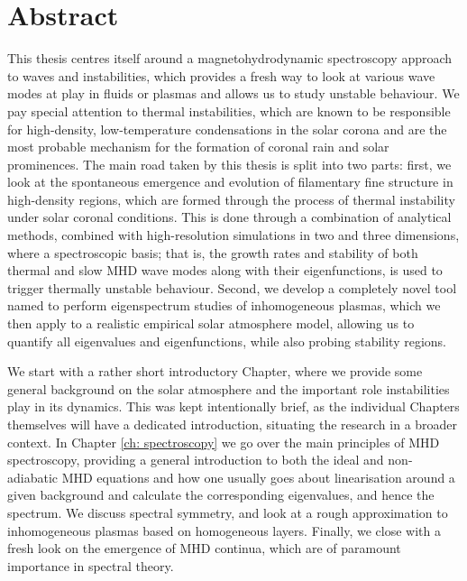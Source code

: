 \chapter*{Abstract} \label{ch: abstract}

This thesis centres itself around a magnetohydrodynamic spectroscopy approach to waves and instabilities, which provides a fresh way to look at various wave modes at play in fluids or plasmas and allows us to study unstable behaviour. We pay special attention to thermal instabilities, which are known to be responsible for high-density, low-temperature condensations in the solar corona and are the most probable mechanism for the formation of coronal rain and solar prominences. The main road taken by this thesis is split into two parts: first, we look at the spontaneous emergence and evolution of filamentary fine structure in high-density regions, which are formed through the process of thermal instability under solar coronal conditions. This is done through a combination of analytical methods, combined with high-resolution simulations in two and three dimensions, where a spectroscopic basis; that is, the growth rates and stability of both thermal and slow MHD wave modes along with their eigenfunctions, is used to trigger thermally unstable behaviour. Second, we develop a completely novel tool named {\legolas} to perform eigenspectrum studies of inhomogeneous plasmas, which we then apply to a realistic empirical solar atmosphere model, allowing us to quantify all eigenvalues and eigenfunctions, while also probing stability regions.

We start with a rather short introductory Chapter, where we provide some general background on the solar atmosphere and the important role instabilities play in its dynamics. This was kept intentionally brief, as the individual Chapters themselves will have a dedicated introduction, situating the research in a broader context. In Chapter \ref{ch: spectroscopy} we go over the main principles of MHD spectroscopy, providing a general introduction to both the ideal and non-adiabatic MHD equations and how one usually goes about linearisation around a given background and calculate the corresponding eigenvalues, and hence the spectrum. We discuss spectral symmetry, and look at a rough approximation to inhomogeneous plasmas based on homogeneous layers. Finally, we close with a fresh look on the emergence of MHD continua, which are of paramount importance in spectral theory.

